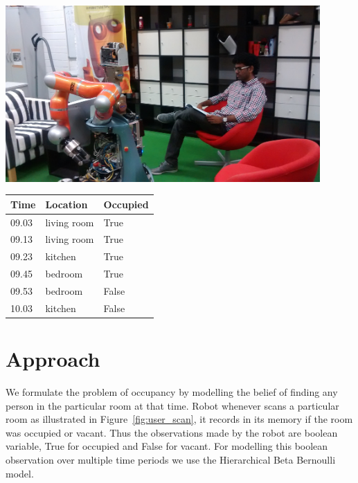   \begin{minipage}{\textwidth}
  \begin{minipage}[b]{0.49\textwidth}
    \centering
        \includegraphics[width=0.9\textwidth]{images/cleaning_1.jpg}
    \label{fig:user_scan}
  \end{minipage}
  \hfill
  \begin{minipage}[b]{0.49\textwidth}
    \centering
    \begin{tabular}{|l|l|l|}
        \hline
	        Time & Location &  Occupied\\
        \hline
        \hline
	        09.03 & living room & True\\
        \hline
	        09.13 & living room & True\\
        \hline
	        09.23 & kitchen &  True\\
        \hline
	        09.45 & bedroom &  True\\
        \hline
	        09.53 & bedroom &  False\\
        \hline
	        10.03 & kitchen &  False\\
        \hline
        \end{tabular}
      \label{tab:robot_memory}
    \end{minipage}
  \end{minipage}


\section{Approach}

We formulate the problem of occupancy by modelling the belief of finding any person in the particular room at that time. Robot whenever scans a particular room as illustrated in Figure~\ref{fig:user_scan}, it records in its memory if the room was occupied or vacant. Thus the observations made by the robot are boolean variable, True for occupied and False for vacant. For modelling this boolean observation over multiple time periods we use the Hierarchical Beta Bernoulli model.


